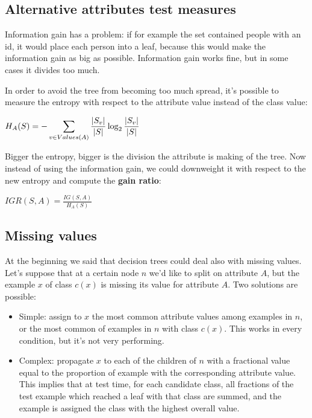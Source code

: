 \subsection{Alternative attributes test measures}
Information gain has a problem: if for example the set contained people with an id, it would place each person into a leaf, because this would make the information gain as big as possible. \newline
Information gain works fine, but in some cases it divides too much. \newline

In order to avoid the tree from becoming too much spread, it's possible to measure the entropy with respect to the attribute value instead of the class value:
\begin{center}
	$\displaystyle H_A(S)=-\displaystyle\sum_{v\in Values(A)}\frac{\vert S_v \vert}{\vert S \vert}\log_2\frac{\vert S_v \vert}{\vert S \vert}$
\end{center}
Bigger the entropy, bigger is the division the attribute is making of the tree.\newline
Now instead of using the information gain, we could downweight it with respect to the new entropy and compute the \textbf{gain ratio}:
\begin{center}
	$\displaystyle IGR(S,A)=\frac{IG(S,A)}{H_A(S)}$
\end{center}
%
%
\subsection{Missing values}
At the beginning we said that decision trees could deal also with missing values. Let's suppose that at a certain node $n$ we'd like to split on attribute $A$, but the example $x$ of class $c(x)$ is missing its value for attribute $A$. Two solutions are possible:
\begin{itemize}
	\item Simple: assign to $x$ the most common attribute values among examples in $n$, or the most common of examples in $n$ with class $c(x)$. This works in every condition, but it's not very performing.
	\item Complex: propagate $x$ to each of the children of $n$ with a fractional value equal to the proportion of example with the corresponding attribute value. This implies that at test time, for each candidate class, all fractions of the test example which reached a leaf with that class are summed, and the example is assigned the class with the highest overall value. 
\end{itemize}
%
%
%
